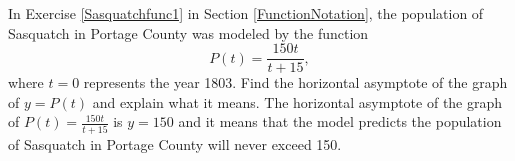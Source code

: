 {In Exercise \ref{Sasquatchfunc1} in Section \ref{FunctionNotation}, the population of Sasquatch in Portage County was modeled by the function \[P(t) = \frac{150t}{t + 15},\] where $t = 0$ represents the year 1803.  Find the horizontal asymptote of the graph of $y = P(t)$ and explain what it means.}
{The horizontal asymptote of the graph of $P(t) = \frac{150t}{t + 15}$ is $y = 150$ and it means that the model predicts the population of Sasquatch in Portage County will never exceed 150.}